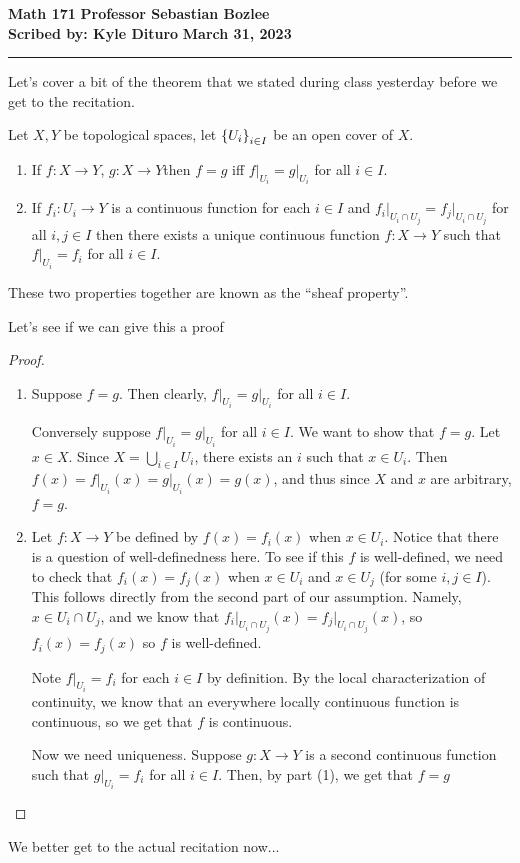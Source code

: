 \documentclass[12pt, twosided]{article}
\begin{document}
\noindent \textbf{Math 171} \hfill \textbf{Professor Sebastian Bozlee} \\
\textbf{Scribed by: Kyle Dituro} \hfill \textbf{March 31, 2023}\hrule
\vspace{.2in}

Let's cover a bit of the theorem that we stated during class yesterday before we get to the recitation.

\begin{thm}
  Let \(X, Y\) be topological spaces, let \(\left\{ U_i \right\}_{i \in I}\) be an open cover of \(X\).
  \begin{enumerate}
  \item If \(f: X \to Y\), \(g: X \to Y\)then \(f = g\) iff \(f\vert_{U_i} = g\vert_{U_i}\) for all \(i \in I\).
  \item If \(f_i : U_i \to Y\) is a continuous function for each \(i \in I\) and \(f_i\vert_{U_i \cap U_j} = f_j\vert_{U_i \cap U_j}\) for all \(i, j \in I\) then there exists a unique continuous function \(f:X \to Y\) such that \(f\vert_{U_i} = f_i\) for all \(i \in I\).
  \end{enumerate}
\end{thm}
\begin{rmk}
  These two properties together are known as the ``sheaf property''.
\end{rmk}
Let's see if we can give this a proof

\begin{proof}
  \begin{enumerate}
  \item Suppose \(f = g\). Then clearly, \(f\vert_{U_i} = g\vert_{U_i}\) for all \(i \in I\).

    Conversely suppose \(f\vert_{U_i} = g\vert_{U_i}\) for all \(i \in I\). We want to show that \(f = g\). Let \(x \in X\). Since \(X = \bigcup_{i \in I} U_i\), there exists an \(i\) such that \(x \in U_i\). Then \(f(x) = f\vert_{U_i}(x) = g\vert_{U_i}(x) = g(x)\), and thus since \(X\) and \(x\) are arbitrary, \(f = g\). \partdone
  \item Let \(f: X \to Y\) be defined by \(f(x) = f_i(x)\) when \(x \in U_i\). Notice that there is a question of well-definedness here. To see if this \(f\) is well-defined, we need to check that \(f_i(x) = f_j(x)\) when \(x \in U_i\) and \(x \in U_j\) (for some \(i,j \in I\)). This follows directly from the second part of our assumption. Namely, \(x \in U_i \cap U_j\), and we know that \(f_i\vert_{U_i \cap U_j}(x) = f_j\vert_{U_i \cap U_j}(x)\), so \(f_i(x) = f_j(x)\) so \(f\) is well-defined.

    Note \(f\vert_{U_i} = f_i\) for each \(i \in I\) by definition. By the local characterization of continuity, we know that an everywhere locally continuous function is continuous, so we get that \(f\) is continuous.

    Now we need uniqueness. Suppose \(g: X \to Y\) is a second continuous function such that \(g\vert_{U_i} = f_i\) for all \(i \in I\). Then, by part (1), we get that \(f = g\)
  \end{enumerate}
\end{proof}

We better get to the actual recitation now...
\end{document}
